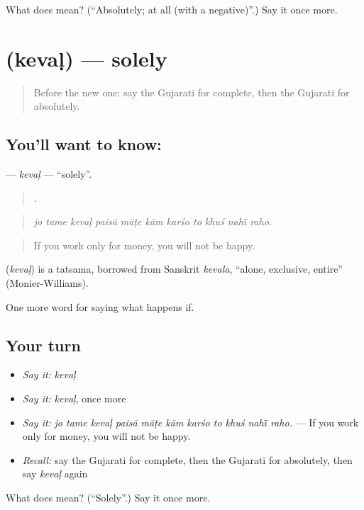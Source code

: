 \begin{tcolorbox}[breakable,colback=teal!4,colframe=teal!35!black,title={Before you move on}]
What does  mean? (\textquotedblleft{}Absolutely; at all (with a negative)\textquotedblright{}.) Say it once more.
\end{tcolorbox}
\section[\texorpdfstring{\gu{કેવળ} (kevaḷ)}{કેવળ (kevaḷ)}]{ (kevaḷ) — solely}

\label{lesson:GU-C379-keval}



\begin{quote}
Before the new one: say the Gujarati for complete, then the Gujarati for absolutely.
\end{quote}

\subsection*{You'll want to know: }
\textbf{} — \emph{kevaḷ} — \textquotedblleft{}solely\textquotedblright{}.

\begin{quote}
          .
\end{quote}

\begin{quote}
\emph{jo tame kevaḷ paisā māṭe kām karśo to khuś nahī̃ raho.}
\end{quote}

\begin{quote}
If you work only for money, you will not be happy.
\end{quote}

\begin{cousinweb}
\textbf{} (\emph{kevaḷ}) is a tatsama, borrowed from Sanskrit \emph{kevala}, \textquotedblleft{}alone, exclusive, entire\textquotedblright{} (Monier-Williams).
\end{cousinweb}

\begin{grammarlens}[title={What you've built}]
One more word for saying what happens if.
\end{grammarlens}

\subsection*{Your turn}
\begin{itemize}
\raggedright
  \item \emph{Say it:} \emph{kevaḷ}
  \item \emph{Say it:} \emph{kevaḷ}, once more
  \item \emph{Say it:} \emph{jo tame kevaḷ paisā māṭe kām karśo to khuś nahī̃ raho.} — If you work only for money, you will not be happy.
  \item \emph{Recall:} say the Gujarati for complete, then the Gujarati for absolutely, then say \emph{kevaḷ} again
\end{itemize}

\begin{tcolorbox}[breakable,colback=teal!4,colframe=teal!35!black,title={Before you move on}]
What does  mean? (\textquotedblleft{}Solely\textquotedblright{}.) Say it once more.
\end{tcolorbox}
